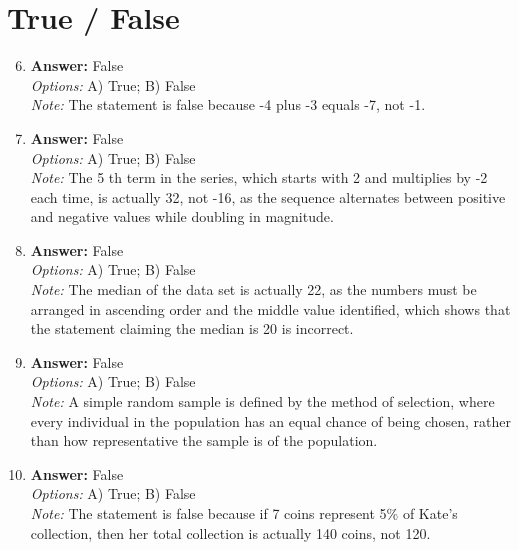 \documentclass[12pt]{article}
\begin{document}
\section*{True / False}
\begin{enumerate}[label=\arabic*.]
\setcounter{enumi}{5}
\item \textbf{Answer:} False
\\ \textit{Options:} A) True; B) False
\\ \textit{Note:} The statement is false because -4 plus -3 equals -7, not -1.
\item \textbf{Answer:} False
\\ \textit{Options:} A) True; B) False
\\ \textit{Note:} The 5 th term in the series, which starts with 2 and multiplies by -2 each time, is actually 32, not -16, as the sequence alternates between positive and negative values while doubling in magnitude.
\item \textbf{Answer:} False
\\ \textit{Options:} A) True; B) False
\\ \textit{Note:} The median of the data set is actually 22, as the numbers must be arranged in ascending order and the middle value identified, which shows that the statement claiming the median is 20 is incorrect.
\item \textbf{Answer:} False
\\ \textit{Options:} A) True; B) False
\\ \textit{Note:} A simple random sample is defined by the method of selection, where every individual in the population has an equal chance of being chosen, rather than how representative the sample is of the population.
\item \textbf{Answer:} False
\\ \textit{Options:} A) True; B) False
\\ \textit{Note:} The statement is false because if 7 coins represent 5\% of Kate's collection, then her total collection is actually 140 coins, not 120.
\end{enumerate}
\end{document}
